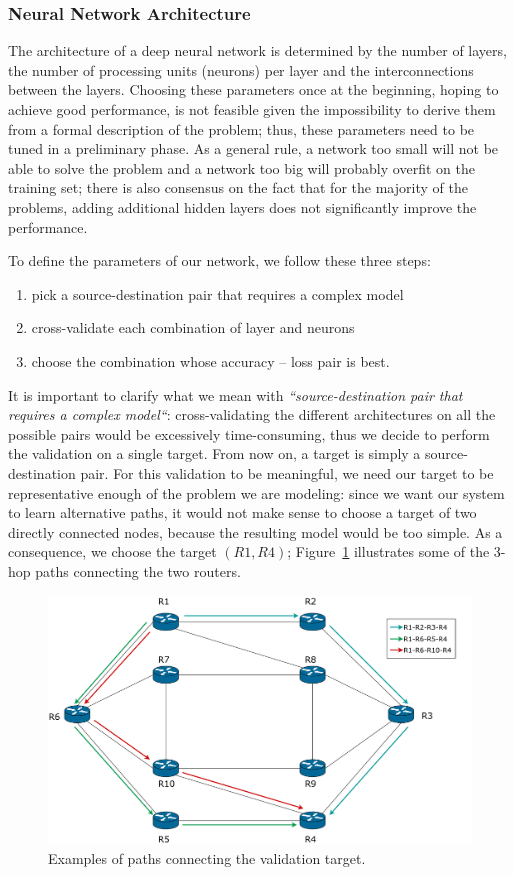 \subsubsection{Neural Network Architecture}
The architecture of a deep neural network is determined by the number of layers, the number of processing units (neurons) per layer and the interconnections between the layers. Choosing these parameters once at the beginning, hoping to achieve good performance, is not feasible given the impossibility to derive them from a formal description of the problem; thus, these parameters need to be tuned in a preliminary phase. As a general rule, a network too small will not be able to solve the problem and a network too big will probably overfit on the training set; there is also consensus on the fact that for the majority of the problems, adding additional hidden layers does not significantly improve the performance.

To define the parameters of our network, we follow these three steps:
\begin{enumerate}
\item pick a source-destination pair that requires a complex model
\item cross-validate each combination of layer and neurons
\item choose the combination whose accuracy -- loss pair is best.
\end{enumerate}

It is important to clarify what we mean with \textit{``source-destination pair that requires a complex model``}: cross-validating the different architectures on all the possible pairs would be excessively time-consuming, thus we decide to perform the validation on a single target. From now on, a target is simply a source-destination pair. For this validation to be meaningful, we need our target to be representative enough of the problem we are modeling: since we want our system to learn alternative paths, it would not make sense to choose a target of two directly connected nodes, because the resulting model would be too simple. As a consequence, we choose the target $(R1, R4)$; Figure~\ref{fig:validation_target} illustrates some of the 3-hop paths connecting the two routers.

\begin{figure}[]
\centering
\includegraphics[width=\textwidth]{img/validation_target}
\caption{Examples of paths connecting the validation target.}
\label{fig:validation_target}
\end{figure}


